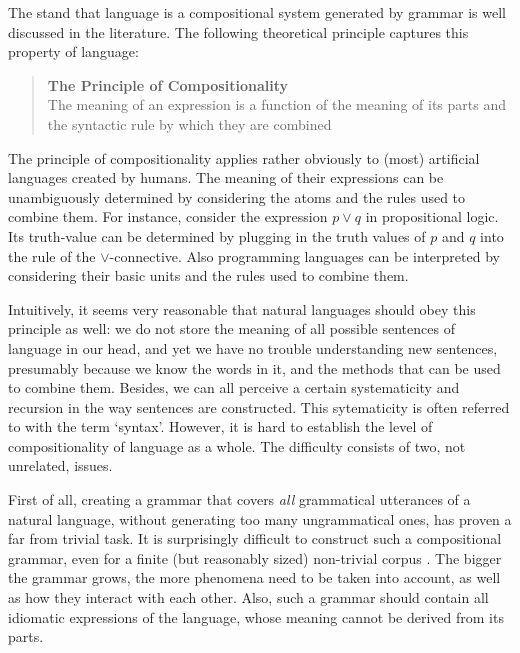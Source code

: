 \documentclass{report}
\begin{document}
The stand that language is a compositional system generated by grammar is well discussed in the literature. The following theoretical principle captures this property of language:

\begin{quote}
\textbf{The Principle of Compositionality}\\
The meaning of an expression is a function of the meaning of its parts and the syntactic rule by which they are combined \citep{partee1984compositionality}
\end{quote}

The principle of compositionality applies rather obviously to (most) artificial languages created by humans. The meaning of their expressions can be unambiguously determined by considering the atoms and the rules used to combine them. For instance, consider the expression $p\lor q$ in propositional logic. Its truth-value can be determined by plugging in the truth values of $p$ and $q$ into the rule of the $\lor$-connective. Also programming languages can be interpreted by considering their basic units and the rules used to combine them.

Intuitively, it seems very reasonable that natural languages should obey this principle as well: we do not store the meaning of all possible sentences of language in our head, and yet we have no trouble understanding new sentences, presumably because we know the words in it, and the methods that can be used to combine them. Besides, we can all perceive a certain systematicity and recursion in the way sentences are constructed. This sytematicity is often referred to with the term `syntax'. However, it is hard to establish the level of compositionality of language as a whole. The difficulty consists of two, not unrelated, issues.

First of all, creating a grammar that covers \textit{all} grammatical utterances of a natural language, without generating too many ungrammatical ones, has proven a far from trivial task. It is surprisingly difficult to construct such a compositional grammar, even for a finite (but reasonably sized) non-trivial corpus \citep{scha1990taaltheorie}. The bigger the grammar grows, the more phenomena need to be taken into account, as well as how they interact with each other. Also, such a grammar should contain all idiomatic expressions of the language, whose meaning cannot be derived from its parts.
\end{document}
